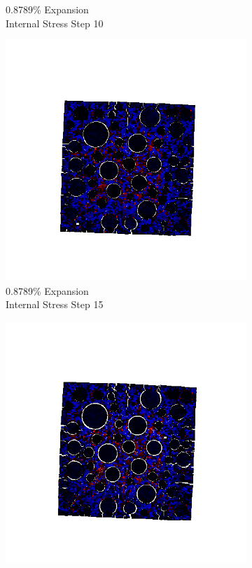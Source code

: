 \begin{figure}[ht!]
\begin{subfigure}{.25\textwidth}
      \caption{0.8789\% Expansion\\Internal Stress Step 10}
    \end{subfigure}%
    \begin{subfigure}{.25\textwidth}
      \centering
      \includegraphics[width=1.0\linewidth]{Files/exp_3D/DEF/A30X0C_4_s15.png}
      \caption{0.8789\% Expansion\\Internal Stress Step 15}
    \end{subfigure}%
    \begin{subfigure}{.25\textwidth}
      \centering
      \includegraphics[width=1.0\linewidth]{Files/exp_3D/DEF/A30X0C_4_stress.png}

\end{subfigure}
\end{figure}
